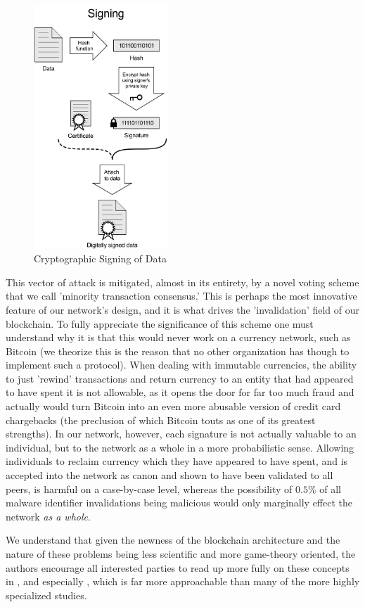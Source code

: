\documentclass[12pt,journal]{IEEEtran}
\begin{document}
\begin{figure}[!t]
\centering
\includegraphics[width=2in]{figures/vector/signatureStep}
\caption{Cryptographic Signing of Data\cite{Acdx2008}}
\label{fig_signing}
\end{figure}

This vector of attack is mitigated, almost in its entirety, by a novel voting scheme that we call 'minority transaction consensus.' This is perhaps the most innovative feature of our network's design, and it is what drives the 'invalidation' field of our blockchain. To fully appreciate the significance of this scheme one must understand why it is that this would never work on a currency network, such as Bitcoin (we theorize this is the reason that no other organization has though to implement such a protocol). When dealing with immutable currencies, the ability to just 'rewind' transactions and return currency to an entity that had appeared to have spent it is not allowable, as it opens the door for far too much fraud and actually would turn Bitcoin into an even more abusable version of credit card chargebacks (the preclusion of which Bitcoin touts as one of its greatest strengths). In our network, however, each signature is not actually valuable to an individual, but to the network as a whole in a more probabilistic sense. Allowing individuals to reclaim currency which they have appeared to have spent, and is accepted into the network as canon  and shown to have been validated to all peers, is harmful on a case-by-case level, whereas the possibility of $0.5\%$ of all malware identifier invalidations being malicious would only marginally effect the network \textit{as a whole}.\par
We understand that given the newness of the blockchain architecture and the nature of these problems being less scientific and more game-theory oriented, the authors encourage all interested parties to read up more fully on these concepts in \cite{Reid2011,Kroll2013,Nakamoto2008}, and especially \cite{wright2015decentralized}, which is far more approachable than many of the more highly specialized studies.\par
\end{document}
